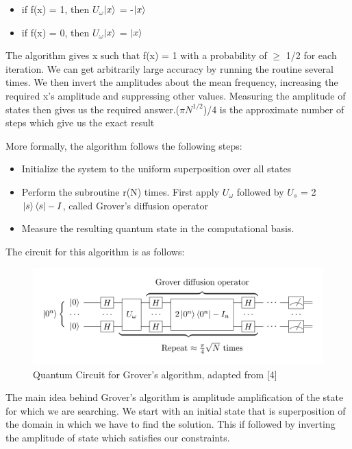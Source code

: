 \documentclass{article}
\begin{document}
\begin{itemize}
    \item if f(x) = 1, then $U_\omega$$\ket{x}$ = -$\ket{x}$
    \item if f(x) = 0, then $U_\omega$$\ket{x}$ = $\ket{x}$
\end{itemize}

The algorithm gives x such that f(x) = 1 with a probability of $\geq$ 1/2 for each iteration. We can get arbitrarily large accuracy by running the routine several times. We then invert the amplitudes about the mean frequency, increasing the required x's amplitude and suppressing other values. Measuring the amplitude of states then gives us the required answer.($\pi N ^ {1/2}$)/4 is the approximate number of steps which give us the exact result

More formally, the algorithm follows the following steps:

\begin{itemize}
    \item Initialize the system to the uniform superposition over all states
    \item Perform the subroutine r(N) times. First apply $U_\omega$ followed by $U_s$ = 2 $\ket{s}\bra{s} - I$, called Grover's diffusion operator
    \item Measure the resulting quantum state in the computational basis.
\end{itemize}

The circuit for this algorithm is as follows:

\begin{figure}[h]
  \centering
\includegraphics[width=1\textwidth]{grover.png}
  \caption{Quantum Circuit for Grover's algorithm, adapted from [4]}
  \label{Quantum Circuit for Grover's algorithm}
\end{figure}

The main idea behind Grover's algorithm is amplitude amplification of the state for which we are searching. We start with an initial state that is superposition of the domain in which we have to find the solution. This if followed by inverting the amplitude of state which satisfies our constraints. 
\end{document}
